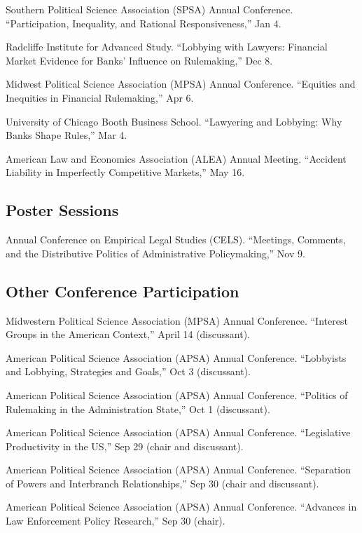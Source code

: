 \documentclass[12pt,letterpaper]{report}
\newcommand{\talk}[4]{\item[#1]{\tab{}#3. \enquote{#2,} #4.}} %
\newcommand{\APSA}{American Political Science Association (APSA) Annual Conference}
\newcommand{\MPSA}{Midwestern Political Science Association (MPSA) Annual Conference}
\begin{document}
\begin{tablist}
    \talk{2018}{Participation, Inequality, and Rational Responsiveness}{Southern Political Science Association (SPSA) Annual Conference}{Jan 4}    
    \talk{2017}{Lobbying with Lawyers: Financial Market Evidence for Banks’ Influence on Rulemaking}{Radcliffe Institute for Advanced Study}{Dec 8}
    \talk{2017}{Equities and Inequities in Financial Rulemaking}{Midwest Political Science Association (MPSA) Annual Conference}{Apr 6}
	\talk{2017}{Lawyering and Lobbying: Why Banks Shape Rules}{University of Chicago Booth Business School}{Mar 4}
	\talk{2015}{Accident Liability in Imperfectly Competitive Markets}{American Law and Economics Association (ALEA) Annual Meeting}{May 16}
    \end{tablist}
    
    \subsection*{Poster Sessions}
    \begin{tablist}
    \talk{2018}{Meetings, Comments, and the Distributive Politics of Administrative Policymaking}{Annual Conference on Empirical Legal Studies (CELS)}{Nov 9}
    \end{tablist}

    \subsection*{Other Conference Participation}
    \begin{tablist}
	\talk{2023}{Interest Groups in the American Context}{\MPSA}{April 14 (discussant)}
    \talk{2021}{Lobbyists and Lobbying, Strategies and Goals}{\APSA}{Oct 3 (discussant)}    
    \talk{2021}{Politics of Rulemaking in the Administration State}{\APSA}{Oct 1 (discussant)}    
    \talk{2021}{Legislative Productivity in the US}{\APSA}{Sep 29 (chair and discussant)}
    \talk{2021}{Separation of Powers and Interbranch Relationships}{\APSA}{Sep 30 (chair and discussant)}
    \talk{2021}{Advances in Law Enforcement Policy Research}{\APSA}{Sep 30 (chair)}
    \end{tablist}
\end{document}
